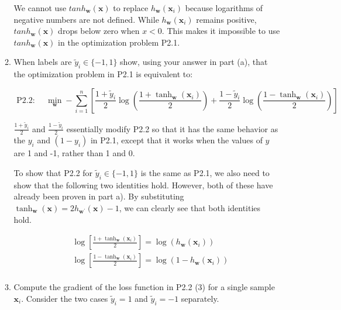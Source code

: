 \documentclass[letterpaper]{article}
\theoremstyle{definition}
\begin{document}
\begin{enumerate}
\begin{enumerate}
\color{teal}
We cannot use \(tanh_{\mathbf{w}}(\mathbf{x})\) to replace
\(h_{\mathbf{w}}\left(\mathbf{x}_{i}\right)\) because logarithms of negative numbers are not
defined. While \(h_{\mathbf{w}}\left(\mathbf{x}_{i}\right)\) remains positive,
\(tanh_{\mathbf{w}}(\mathbf{x})\) drops below zero when \(x < 0\). This makes it impossible
to use \(tanh_{\mathbf{w}}(\mathbf{x})\) in the optimization problem P2.1.
\color{black}

\item When labels are \(\tilde{y}_{i} \in\{-1,1\}\) show, using your answer in part (a), that the optimization problem in P2.1 is equivalent to:

\begin{equation*}
\text { P2.2: } \quad \min _{\mathbf{w}}-\sum_{i=1}^{n}\left[\frac{1+\tilde{y}_{i}}{2} \log \left(\frac{1+\tanh _{\mathbf{w}}\left(\mathbf{x}_{i}\right)}{2}\right)+\frac{1-\tilde{y}_{i}}{2} \log \left(\frac{1-\tanh _{\mathbf{w}}\left(\mathbf{x}_{i}\right)}{2}\right)\right] \tag{3}
\end{equation*}

\color{teal}
\(\frac{1 + \tilde{y}_{i}}{2}\) and \(\frac{1 - \tilde{y}_{i}}{2}\) essentially modify P2.2 so
that it has the same behavior as the \(y_i\) and \((1-y_i)\) in P2.1, except that it works when
the values of \(y\) are 1 and -1, rather than 1 and 0.

To show that P2.2 for \(\tilde{y}_i \in \{-1, 1\}\) is the same as P2.1, we also need to show
that the following two identities hold. However, both of these have already been proven in
part a). By substituting \(\tanh _{\mathbf{w}}(\mathbf{x})=2 h_{\mathbf{w}^{\prime}}(\mathbf{x})-1\),
we can clearly see that both identities hold.

\begin{align*}
&\log \left[\frac{1+\tanh _{\mathbf{w}}\left(\mathbf{x}_{i}\right)}{2}\right] =
\log \left(h_{\mathbf{w}}\left(\mathbf{x}_{i}\right)\right) \\
&\log \left[\frac{1-\tanh _{\mathbf{w}}\left(\mathbf{x}_{i}\right)}{2}\right] =
\log \left(1 - h_{\mathbf{w}}\left(\mathbf{x}_{i}\right)\right) \\
\end{align*}
\color{black}

\item Compute the gradient of the loss function in P2.2 (3) for a single sample \(\mathbf{x}_{i}\). Consider the two cases \(\tilde{y}_{i}=1\) and \(\tilde{y}_{i}=-1\) separately.

\color{teal}


\end{enumerate}
\end{enumerate}
\end{document}
